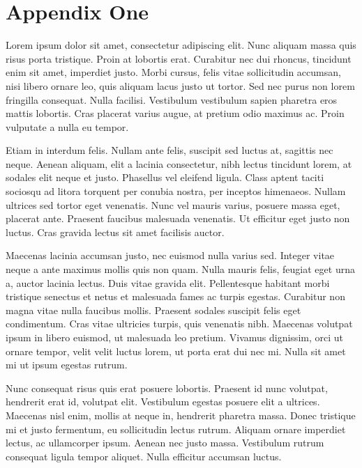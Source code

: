 
\newpage
\chapter{Appendix One}


Lorem ipsum dolor sit amet, consectetur adipiscing elit. Nunc aliquam massa quis risus porta tristique. Proin at lobortis erat. Curabitur nec dui rhoncus, tincidunt enim sit amet, imperdiet justo. Morbi cursus, felis vitae sollicitudin accumsan, nisi libero ornare leo, quis aliquam lacus justo ut tortor. Sed nec purus non lorem fringilla consequat. Nulla facilisi. Vestibulum vestibulum sapien pharetra eros mattis lobortis. Cras placerat varius augue, at pretium odio maximus ac. Proin vulputate a nulla eu tempor.

Etiam in interdum felis. Nullam ante felis, suscipit sed luctus at, sagittis nec neque. Aenean aliquam, elit a lacinia consectetur, nibh lectus tincidunt lorem, at sodales elit neque et justo. Phasellus vel eleifend ligula. Class aptent taciti sociosqu ad litora torquent per conubia nostra, per inceptos himenaeos. Nullam ultrices sed tortor eget venenatis. Nunc vel mauris varius, posuere massa eget, placerat ante. Praesent faucibus malesuada venenatis. Ut efficitur eget justo non luctus. Cras gravida lectus sit amet facilisis auctor.

Maecenas lacinia accumsan justo, nec euismod nulla varius sed. Integer vitae neque a ante maximus mollis quis non quam. Nulla mauris felis, feugiat eget urna a, auctor lacinia lectus. Duis vitae gravida elit. Pellentesque habitant morbi tristique senectus et netus et malesuada fames ac turpis egestas. Curabitur non magna vitae nulla faucibus mollis. Praesent sodales suscipit felis eget condimentum. Cras vitae ultricies turpis, quis venenatis nibh. Maecenas volutpat ipsum in libero euismod, ut malesuada leo pretium. Vivamus dignissim, orci ut ornare tempor, velit velit luctus lorem, ut porta erat dui nec mi. Nulla sit amet mi ut ipsum egestas rutrum.

Nunc consequat risus quis erat posuere lobortis. Praesent id nunc volutpat, hendrerit erat id, volutpat elit. Vestibulum egestas posuere elit a ultrices. Maecenas nisl enim, mollis at neque in, hendrerit pharetra massa. Donec tristique mi et justo fermentum, eu sollicitudin lectus rutrum. Aliquam ornare imperdiet lectus, ac ullamcorper ipsum. Aenean nec justo massa. Vestibulum rutrum consequat ligula tempor aliquet. Nulla efficitur accumsan luctus.

